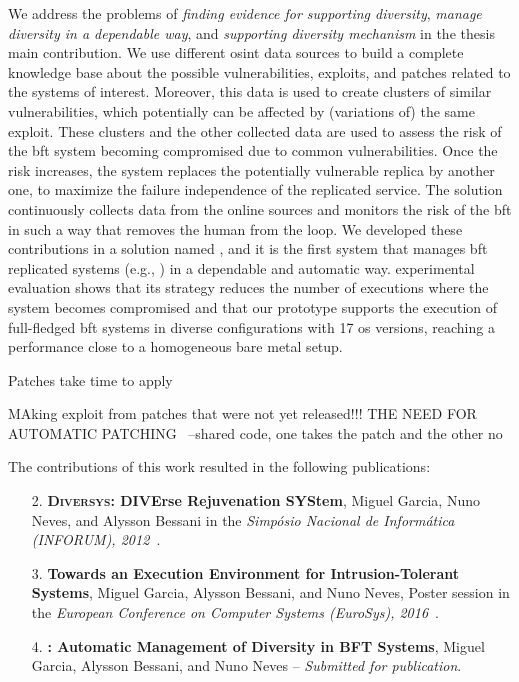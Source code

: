 We address the problems of \emph{finding evidence for supporting diversity}, \emph{manage diversity in a dependable way}, and \emph{supporting diversity mechanism} in the thesis main contribution.
We use different \gls{osint} data sources to build a complete knowledge base about the possible vulnerabilities, exploits, and patches related to the systems of interest. 
Moreover, this data is used to create clusters of similar vulnerabilities, which potentially can be affected by (variations of) the same exploit. 
These clusters and the other collected data are used to assess the risk of the \gls{bft} system becoming compromised due to common vulnerabilities.
Once the risk increases, the system replaces the potentially vulnerable replica by another one, to maximize the failure independence of the replicated service.
The solution continuously collects data from the online sources and monitors the risk of the \gls{bft} in such a way that removes the human from the loop.
We developed these contributions in a solution named \system, and it is the first system that manages \gls{bft} replicated systems (e.g., \sieveq) in a dependable and automatic way.
\system experimental evaluation shows that its strategy reduces the number of executions where the system becomes compromised and that our prototype supports the execution of full-fledged \gls{bft} systems in diverse configurations with 17 \gls{os} versions, reaching a performance close to a homogeneous bare metal setup. 


Patches take time to apply~\cite{Frei:2010}

MAking exploit from patches that were not yet released!!!\cite{Brumley:2008}
THE NEED FOR AUTOMATIC PATCHING~\cite{Nappa:2015} --shared code, one takes the patch and the other no


The contributions of this work resulted in the following publications:

\begin{enumerate}

\item[2.] \textbf{\textsc{Diversys}: DIVErse Rejuvenation SYStem}, Miguel Garcia, Nuno Neves, and  Alysson Bessani in the \emph{Simp\'{o}sio Nacional de Inform\'{a}tica (INFORUM), 2012~\cite{Garcia:2012b}}.


\item[3.] \textbf{Towards an Execution Environment for Intrusion-Tolerant Systems}, Miguel Garcia, Alysson Bessani, and Nuno Neves, Poster session in the \emph{European Conference on Computer Systems (EuroSys), 2016}~\cite{Garcia:2016b}.


\item[4.] \textbf{\system: Automatic Management of Diversity in BFT Systems}, Miguel Garcia, Alysson Bessani, and Nuno Neves -- \emph{Submitted for publication}.

\end{enumerate}


